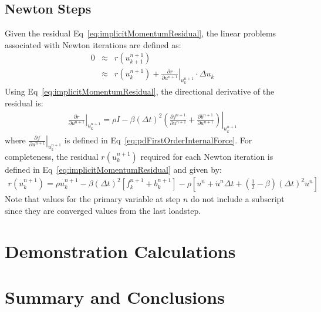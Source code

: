 \documentclass[pdf,ps2pdf,12pt]{SANDreport}
\begin{document}
\subsection{Newton Steps}
Given the residual Eq~\ref{eq:implicitMomentumResidual}, the linear problems associated with Newton iterations are defined as:
\begin{eqnarray}
0 & \approx & r({u}^{n+1}_{k+1}) \nonumber \\
   & \approx & r({u}^{n+1}_{k}) + \left . \frac{\partial r}{\partial {u}^{n+1}}\right\vert_{{u}^{n+1}_{k}} \cdot \Delta u_k \label{eq:newtonIteration}
\end{eqnarray}
Using Eq~\ref{eq:implicitMomentumResidual}, the directional derivative of the residual is:
\begin{eqnarray}
 \left . \frac{\partial r}{\partial {u}^{n+1}}\right\vert_{{u}^{n+1}_{k}} = \rho I -\beta ({\Delta t})^2 \left . \left( \frac{\partial f^{n+1}}{\partial {u}^{n+1}}+\frac{\partial b^{n+1}} {\partial {u}^{n+1}}\right)\right\vert _{{u}^{n+1}_{k}}
\end{eqnarray}
where $\left . \frac{\partial f}{\partial {u}^{n+1}}\right\vert_{{u}^{n+1}_{k}}$ is defined in Eq~\ref{eq:pdFirstOrderInternalForce}.  For completeness, the residual $r({u}^{n+1}_{k}) $ required for each Newton iteration is defined in Eq~\ref{eq:implicitMomentumResidual} and given by:
\begin{eqnarray}
r({u}^{n+1}_k) = \rho {u}^{n+1}_k  - \beta (\Delta t)^2 \left[f^{n+1}_k + b^{n+1}_k\right]-\rho \left[ {u}^{n} + \dot{u}^n \Delta t + (\frac{1}{2}-\beta)(\Delta t)^2 \ddot{u}^{n}\right] \label{eq:implicitMomentumResidualNewtonIterationK}
\end{eqnarray}
Note that values for the primary variable at step $n$ do not include a subscript since they are converged values from the last loadstep.

\section{Demonstration Calculations}

\section{Summary and Conclusions}

    
    


\begin{SANDdistribution}
\end{SANDdistribution}
\end{document}
